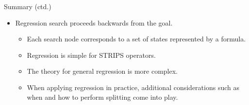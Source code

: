 \documentclass{gkibeamer}
\begin{document}
\begin{frame}{Summary (ctd.)}
  \begin{itemize}
  \item \alert{Regression search} proceeds backwards from the goal.
    \begin{itemize}
    \item Each search node corresponds to a \alert{set of states}
      represented by a \alert{formula}.
    \item Regression is simple for \alert{STRIPS} operators.
    \item The theory for \alert{general regression} is more complex.
    \item When applying regression in practice, additional
      considerations such as when and how to perform \alert{splitting}
      come into play.
    \end{itemize}
  \end{itemize}
\end{frame}
\end{document}
